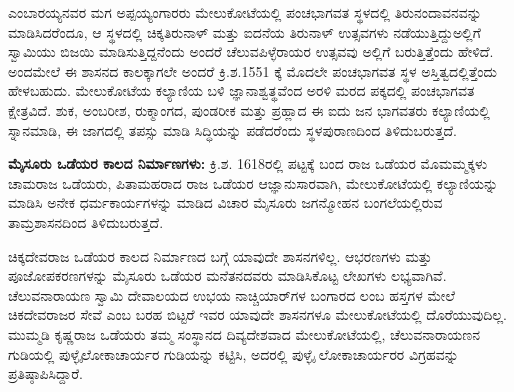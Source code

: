 ಎಂಬಾರಯ್ಯನವರ ಮಗ ಅಪ್ಪಯ್ಯಂಗಾರರು ಮೇಲುಕೋಟೆಯಲ್ಲಿ ಪಂಚಭಾಗವತ ಸ್ಥಳದಲ್ಲಿ ತಿರುನಂದಾವನವನ್ನು ಮಾಡಿಸಿದರೆಂದೂ, ಆ ಸ್ಥಳದಲ್ಲಿ ಚಿಕ್ಕತಿರುನಾಳ್​ ಮತ್ತು ಐದನೆಯ ತಿರುನಾಳ್​ ಉತ್ಸವಗಳು ನಡೆಯುತ್ತಿದ್ದುಅಲ್ಲಿಗೆ ಸ್ವಾಮಿಯು ಬಿಜಯಿ ಮಾಡಿಸುತ್ತಿದ್ದನೆಂದು ಅಂದರೆ ಚೆಲುವಪಿಳ್ಳೆರಾಯರ ಉತ್ಸವವು ಅಲ್ಲಿಗೆ ಬರುತ್ತಿತ್ತೆಂದು ಹೇಳಿದೆ. ಅಂದಮೇಲೆ ಈ ಶಾಸನದ ಕಾಲಕ್ಕಾಗಲೇ ಅಂದರೆ ಕ್ರಿ.ಶ.1551 ಕ್ಕೆ ಮೊದಲೇ ಪಂಚಭಾಗವತ ಸ್ಥಳ ಅಸ್ತಿತ್ವದಲ್ಲಿತ್ತೆಂದು ಹೇಳಬಹುದು. ಮೇಲುಕೋಟೆಯ ಕಲ್ಯಾಣಿಯ ಬಳಿ ಜ್ಞಾನಾಶ್ವತ್ಥವೆಂದ ಅರಳಿ ಮರದ ಪಕ್ಕದಲ್ಲಿ ಪಂಚಭಾಗವತ ಕ್ಷೇತ್ರವಿದೆ. ಶುಕ, ಅಂಬರೀಶ, ರುಕ್ಮಾಂಗದ, ಪುಂಡರೀಕ ಮತ್ತು ಪ್ರಹ್ಲಾದ ಈ ಐದು ಜನ ಭಾಗವತರು ಕಲ್ಯಾಣಿಯಲ್ಲಿ ಸ್ನಾನಮಾಡಿ, ಈ ಜಾಗದಲ್ಲಿ ತಪಸ್ಸು ಮಾಡಿ ಸಿದ್ಧಿಯನ್ನು ಪಡೆದರೆಂದು ಸ್ಥಳಪುರಾಣದಿಂದ ತಿಳಿದುಬರುತ್ತದೆ.

\textbf{ಮೈಸೂರು ಒಡೆಯರ ಕಾಲದ ನಿರ್ಮಾಣಗಳು:} ಕ್ರಿ.ಶ. 1618ರಲ್ಲಿ ಪಟ್ಟಕ್ಕೆ ಬಂದ ರಾಜ ಒಡೆಯರ ಮೊಮಮ್ಮಕ್ಕಳು ಚಾಮರಾಜ ಒಡೆಯರು, ಪಿತಾಮಹರಾದ ರಾಜ ಒಡೆಯರ ಆಜ್ಞಾನುಸಾರವಾಗಿ, ಮೇಲುಕೋಟೆಯಲ್ಲಿ ಕಲ್ಯಾಣಿಯನ್ನು ಮಾಡಿಸಿ ಅನೇಕ ಧರ್ಮಕಾರ್ಯಗಳನ್ನು ಮಾಡಿದ ವಿಚಾರ ಮೈಸೂರು ಜಗನ್ಮೋಹನ ಬಂಗಲೆಯಲ್ಲಿರುವ ತಾಮ್ರಶಾಸನದಿಂದ ತಿಳಿದುಬರುತ್ತದೆ.

ಚಿಕ್ಕದೇವರಾಜ ಒಡೆಯರ ಕಾಲದ ನಿರ್ಮಾಣದ ಬಗ್ಗೆ ಯಾವುದೇ ಶಾಸನಗಳಿಲ್ಲ. ಆಭರಣಗಳು ಮತ್ತು ಪೂಜೋಪಕರಣಗಳನ್ನು ಮೈಸೂರು ಒಡೆಯರ ಮನೆತನದವರು ಮಾಡಿಸಿಕೊಟ್ಟ ಲೇಖಗಳು ಲಭ್ಯವಾಗಿವೆ. ಚೆಲುವನಾರಾಯಣ ಸ್ವಾಮಿ ದೇವಾಲಯದ ಉಭಯ ನಾಚ್ಚಿಯಾರ್​ಗಳ ಬಂಗಾರದ ಲಂಬ ಹಸ್ತಗಳ ಮೇಲೆ ಚಿಕದೇವರಾಜರ ಸೇವೆ ಎಂಬ ಬರಹ ಬಿಟ್ಟರೆ ಇವರ ಯಾವುದೇ ಶಾಸನಗಳೂ ಮೇಲುಕೋಟೆಯಲ್ಲಿ ದೊರೆಯುವುದಿಲ್ಲ. ಮುಮ್ಮಡಿ ಕೃಷ್ಣರಾಜ ಒಡೆಯರು ತಮ್ಮ ಸಂಸ್ಥಾನದ ದಿವ್ಯದೇಶವಾದ ಮೇಲುಕೋಟೆಯಲ್ಲಿ, ಚೆಲುವನಾರಾಯಣನ ಗುಡಿಯಲ್ಲಿ ಪುಳ್ಳೈಲೋಕಾಚಾರ್ಯರ ಗುಡಿಯನ್ನು ಕಟ್ಟಿಸಿ, ಅದರಲ್ಲಿ ಪುಳ್ಳೈ ಲೋಕಾಚಾರ್ಯರರ ವಿಗ್ರಹವನ್ನು ಪ್ರತಿಷ್ಠಾಪಿಸಿದ್ದಾರೆ.

